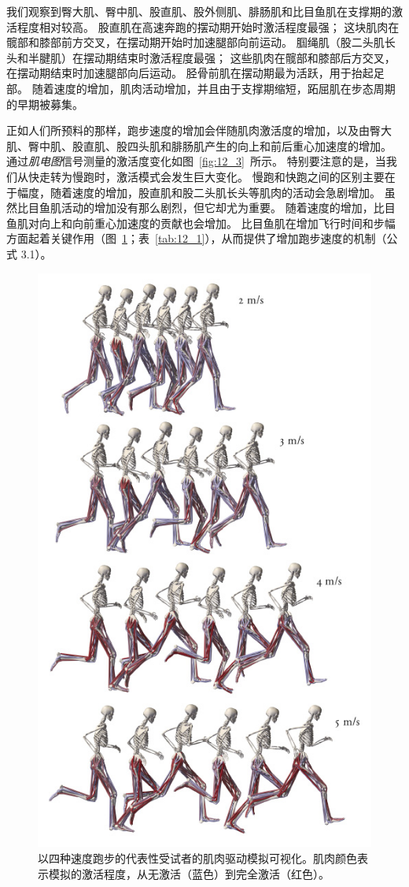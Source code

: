 我们观察到臀大肌、臀中肌、股直肌、股外侧肌、腓肠肌和比目鱼肌在支撑期的激活程度相对较高。
股直肌在高速奔跑的摆动期开始时激活程度最强；
这块肌肉在髋部和膝部前方交叉，在摆动期开始时加速腿部向前运动。
腘绳肌（股二头肌长头和半腱肌）在摆动期结束时激活程度最强；
这些肌肉在髋部和膝部后方交叉，在摆动期结束时加速腿部向后运动。
胫骨前肌在摆动期最为活跃，用于抬起足部。
随着速度的增加，肌肉活动增加，并且由于支撑期缩短，跖屈肌在步态周期的早期被募集。


正如人们所预料的那样，跑步速度的增加会伴随肌肉激活度的增加，以及由臀大肌、臀中肌、股直肌、股四头肌和腓肠肌产生的向上和前后重心加速度的增加。
通过\textit{肌电图}信号测量的激活度变化如图~\ref{fig:12_3}~所示。
特别要注意的是，当我们从快走转为慢跑时，激活模式会发生巨大变化。
慢跑和快跑之间的区别主要在于幅度，随着速度的增加，股直肌和股二头肌长头等肌肉的活动会急剧增加。
虽然比目鱼肌活动的增加没有那么剧烈，但它却尤为重要。
随着速度的增加，比目鱼肌对向上和向前重心加速度的贡献也会增加。
比目鱼肌在增加飞行​​时间和步幅方面起着关键作用（图~\ref{fig:12_4}；表~\ref{tab:12_1}），从而提供了增加跑步速度的机制（公式 3.1）。

\begin{figure}[!htb]
	\centering
	\includegraphics[width=0.8\linewidth]{chap12/12_4}
	\caption{以四种速度跑步的代表性受试者的肌肉驱动模拟可视化。肌肉颜色表示模拟的激活程度，从无激活（蓝色）到完全激活（红色）\cite{arnold2013muscle}。 \label{fig:12_4}}
\end{figure}


